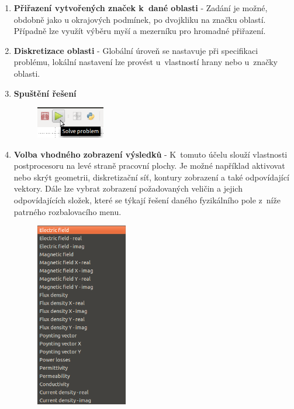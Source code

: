 \begin{enumerate}
\item {\bf Přiřazení vytvořených značek k~dané oblasti} - Zadání je možné, obdobně jako u okrajových podmínek, po dvojkliku na značku oblastí. Případně lze využít výběru myší a mezerníku pro hromadné přiřazení.
\item {\bf Diskretizace oblasti} - Globální úroveň se nastavuje při specifikaci problému, lokální nastavení lze provést u~vlastností hrany nebo u~značky oblasti.
\item {\bf Spuštění řešení}
\begin{figure}[!h]
	\centering
	\includegraphics[width=3cm]{sim_spusteni_reseni.png}
\end{figure}
\item {\bf Volba vhodného zobrazení výsledků} - K~tomuto účelu slouží vlastnosti postprocesoru na levé straně pracovní plochy. Je možné například aktivovat nebo skrýt geometrii, diskretizační síť, kontury zobrazení a také odpovídající vektory. Dále lze vybrat zobrazení požadovaných veličin a jejich odpovídajících složek, které se týkají řešení daného fyzikálního pole z~níže patrného rozbalovacího menu.%
\begin{figure}[!h]
	\centering
	\includegraphics[width=4cm]{sim_zobrazeni.png}
	\label{obr:sim_zobrazeni}
\end{figure}
\end{enumerate}



